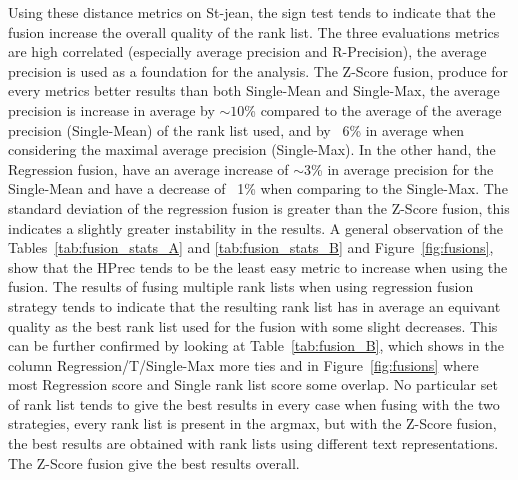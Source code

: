 Using these distance metrics on St-jean, the sign test tends to indicate that the fusion increase the overall quality of the rank list.
The three evaluations metrics are high correlated (especially average precision and R-Precision), the average precision is used as a foundation for the analysis.
The Z-Score fusion, produce for every metrics better results than both Single-Mean and Single-Max, the average precision is increase in average by $\sim 10$\% compared to the average of the average precision (Single-Mean) of the rank list used, and by ~6\% in average when considering the maximal average precision (Single-Max).
In the other hand, the Regression fusion, have an average increase of $\sim 3$\% in average precision for the Single-Mean and have a decrease of ~1\% when comparing to the Single-Max.
The standard deviation of the regression fusion is greater than the Z-Score fusion, this indicates a slightly greater instability in the results.
A general observation of the Tables~\ref{tab:fusion_stats_A} and \ref{tab:fusion_stats_B} and Figure~\ref{fig:fusions}, show that the HPrec tends to be the least easy metric to increase when using the fusion.
The results of fusing multiple rank lists when using regression fusion strategy tends to indicate that the resulting rank list has in average an equivant quality as the best rank list used for the fusion with some slight decreases.
This can be further confirmed by looking at Table~\ref{tab:fusion_B}, which shows in the column Regression/T/Single-Max more ties and in Figure~\ref{fig:fusions} where most Regression score and Single rank list score some overlap.
No particular set of rank list tends to give the best results in every case when fusing with the two strategies, every rank list is present in the argmax, but with the Z-Score fusion, the best results are obtained with rank lists using different text representations.
The Z-Score fusion give the best results overall.

